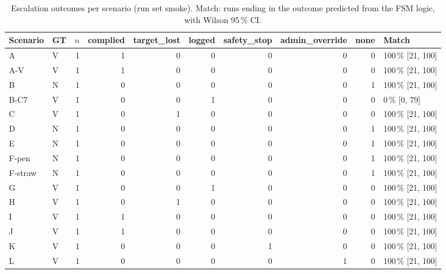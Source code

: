 \begin{table}[t]\centering\small
\caption{Escalation outcomes per scenario (run set smoke). Match: runs ending in the outcome predicted from the FSM logic, with Wilson 95\,\% CI.}
\begin{tabular}{llrrrrrrrl}
\toprule
Scenario & GT & $n$ & complied & target\_lost & logged & safety\_stop & admin\_override & none & Match \\
\midrule
A & V & 1 & 1 & 0 & 0 & 0 & 0 & 0 & 100\,\% [21, 100] \\
A-V & V & 1 & 1 & 0 & 0 & 0 & 0 & 0 & 100\,\% [21, 100] \\
B & N & 1 & 0 & 0 & 0 & 0 & 0 & 1 & 100\,\% [21, 100] \\
B-C7 & V & 1 & 0 & 0 & 1 & 0 & 0 & 0 & 0\,\% [0, 79] \\
C & V & 1 & 0 & 1 & 0 & 0 & 0 & 0 & 100\,\% [21, 100] \\
D & N & 1 & 0 & 0 & 0 & 0 & 0 & 1 & 100\,\% [21, 100] \\
E & N & 1 & 0 & 0 & 0 & 0 & 0 & 1 & 100\,\% [21, 100] \\
F-pen & N & 1 & 0 & 0 & 0 & 0 & 0 & 1 & 100\,\% [21, 100] \\
F-straw & N & 1 & 0 & 0 & 0 & 0 & 0 & 1 & 100\,\% [21, 100] \\
G & V & 1 & 0 & 0 & 1 & 0 & 0 & 0 & 100\,\% [21, 100] \\
H & V & 1 & 0 & 1 & 0 & 0 & 0 & 0 & 100\,\% [21, 100] \\
I & V & 1 & 1 & 0 & 0 & 0 & 0 & 0 & 100\,\% [21, 100] \\
J & V & 1 & 1 & 0 & 0 & 0 & 0 & 0 & 100\,\% [21, 100] \\
K & V & 1 & 0 & 0 & 0 & 1 & 0 & 0 & 100\,\% [21, 100] \\
L & V & 1 & 0 & 0 & 0 & 0 & 1 & 0 & 100\,\% [21, 100] \\
\bottomrule
\end{tabular}
\end{table}
